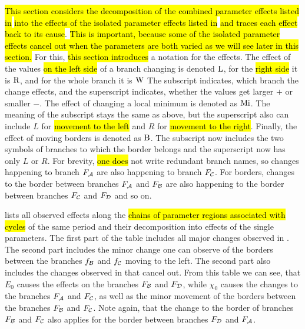 \hl{This section considers the decomposition of the combined parameter effects listed in}  \hl{into the effects of the isolated parameter effects listed in}  \hl{and traces each effect back to its cause}.
\hl{
	This is important, because some of the isolated parameter effects cancel out when the parameters are both varied as we will see later in this section.
}
For this, \hl{this section introduces} a notation for the effects.
The effect of the values \hl{on the left side} of a branch changing is denoted $\operatorname{L}$, for the \hl{right side} it is $\operatorname{R}$, and for the whole branch it is $\operatorname{W}$
The subscript indicates, which branch the change effects, and the superscript indicates, whether the values get larger $+$ or smaller $-$.
The effect of changing a local minimum is denoted as $\operatorname{Mi}$.
The meaning of the subscript stays the same as above, but the superscript also can include $L$ for \hl{movement to the left} and $R$ for \hl{movement to the right}.
Finally, the effect of moving borders is denoted as $\operatorname{B}$.
The subscript now includes the two symbols of branches to which the border belongs and the superscript now has only $L$ or $R$.
For brevity, \hl{one does} not write redundant branch names, so changes happening to branch $F_{\mathcal{A}}$ are also happening to branch $F_{\mathcal{C}}$.
For borders, changes to the border between branches $F_{\mathcal{A}}$ and $F_{\mathcal{B}}$ are also happening to the border between branches $F_{\mathcal{C}}$ and $F_{\mathcal{D}}$ and so on.

 lists all observed effects along the \hl{chains of parameter regions associated with cycles} of the same period and their decomposition into effects of the single parameters.
The first part of the table includes all major changes observed in .
The second part includes the minor change one can observe of the borders between the branches $f_{\mathcal{B}}$ and $f_{\mathcal{C}}$ moving to the left.
The second part also includes the changes observed in  that cancel out.
From this table we can see, that $E_0$ causes the effects on the branches $F_{\mathcal{B}}$ and $F_{\mathcal{D}}$, while $\chi_0$ causes the changes to the branches $F_{\mathcal{A}}$ and $F_{\mathcal{C}}$, as well as the minor movement of the borders between the branches $F_{\mathcal{B}}$ and $F_{\mathcal{C}}$.
Note again, that the change to the border of branches $F_{\mathcal{B}}$ and $F_{\mathcal{C}}$ also applies for the border between branches $F_{\mathcal{D}}$ and $F_{\mathcal{A}}$.

